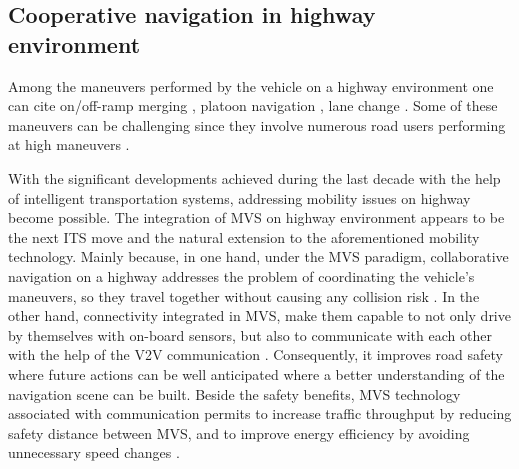 








\subsection{Cooperative navigation in highway environment}
Among the maneuvers performed by the vehicle on a highway environment one can cite on/off-ramp merging \cite{7562449}\cite{zhu2022merging}, platoon navigation \cite{kavathekar2011vehicle}, lane change \cite{moridpour2010lane}. Some of these maneuvers can be challenging since they involve numerous road users performing at high maneuvers \cite{dey2015review}. 
 
With the significant developments achieved during the last decade with the help of intelligent transportation systems, addressing mobility issues on highway become possible. The integration of MVS on highway environment appears to be the next ITS move and the natural extension to the aforementioned mobility technology. Mainly because, in one hand, under the MVS paradigm, collaborative navigation on a highway addresses the problem of coordinating the vehicle's maneuvers, so they travel together without causing any collision risk \cite{bayat2017environmental}\cite{faisal2019understanding}\cite{montanaro2019towards}. In the other hand, connectivity integrated in MVS, make them capable to not only drive by themselves with on-board sensors, but also to communicate with each other with the help of the V2V communication \cite{hakak2022autonomous}\cite{balador2022survey}. Consequently, it improves road safety where future actions can be well anticipated where a better understanding of the navigation scene can be built. Beside the safety benefits, MVS technology associated with communication permits to increase traffic throughput by reducing safety distance between MVS, and to improve energy efficiency by avoiding unnecessary speed changes \cite{bagloee2016autonomous}. 

